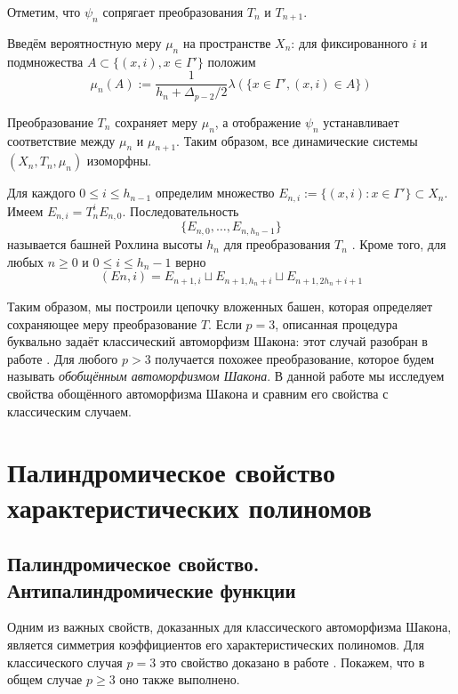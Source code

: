 \documentclass[14pt, a4paper, russian]{report}
\begin{document}
Отметим, что $\psi_n$ сопрягает преобразования $T_n$ и
$T_{n+1}$.

Введём вероятностную меру $\mu_n$ на пространстве $X_n$: для фиксированного $i$ и подмножества
$A \subset \{(x, i), x\in\Gamma' \}$ положим
$$\mu_n(A):=\frac{1}{h_n + \Delta_{p-2}/2} \lambda (\{x \in \Gamma', (x, i) \in A\})$$

Преобразование $T_n$ сохраняет меру $\mu_n$, а отображение $\psi_n$ устанавливает соответствие между $\mu_n$ и $\mu_{n+1}$. Таким образом, все динамические системы $(X_n, T_n, \mu_n)$ изоморфны.

Для каждого $ 0 \le i \le h_{n-1}$ определим множество
$E_{n,i} := \{(x, i) : x \in \Gamma'\} \subset X_n$. Имеем $E_{n,i} = T^i_n E_{n,0}$. Последовательность
 $$\{E_{n,0},\ldots,E_{n,h_n-1}\}$$
называется башней Рохлина высоты $h_n$ для преобразования $T_n$ \cite{rokhlin_towers}. Кроме того, для любых $n \ge 0$ и $0 \le i \le h_n-1$ верно 
\begin{equation}\label{eq:embedding}
(En,i) = E_{n+1,i} \sqcup E_{n+1,h_n+i} \sqcup E_{n+1,2h_n+i+1}
\end{equation}

Таким образом, мы построили цепочку вложенных башен, которая определяет сохраняющее меру преобразование $T$. Если $p=3$, описанная процедура буквально задаёт классический автоморфизм Шакона: этот случай разобран в работе \cite{weaklimits}. Для любого $p > 3$ получается похожее преобразование, которое будем называть \emph{обобщённым автоморфизмом Шакона}. В данной работе мы исследуем свойства обощённого автоморфизма Шакона и сравним его свойства с классическим случаем.

\chapter{Палиндромическое свойство характеристических полиномов}
\section{Палиндромическое свойство. Антипалиндромические функции}
Одним из важных свойств, доказанных для классического автоморфизма Шакона, является симметрия коэффициентов его характеристических полиномов. Для классического случая $p=3$  это свойство доказано в работе \cite{weaklimits}. Покажем, что в общем случае $p \ge 3$ оно также выполнено.
\end{document}
